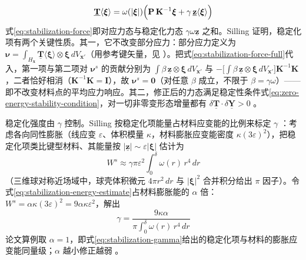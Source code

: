 \begin{equation}
  \underline{\mathbf{T}}\langle\boldsymbol{\xi}\rangle
  =\omega(|\boldsymbol{\xi}|)\Bigl(\mathbf{P}\,\mathbf{K}^{-1}\boldsymbol{\xi}
  +\gamma\,\underline{\mathbf{z}}\langle\boldsymbol{\xi}\rangle\Bigr)
  \label{eq:stabilization-force}
\end{equation}
式\eqref{eq:stabilization-force}即对应力态与稳定化力态 $\gamma\omega\underline{\mathbf{z}}$ 之和。Silling 证明，稳定化项有两个关键性质。其一，它不改变部分应力：部分应力定义为 $\boldsymbol{\nu}=\int_{H_{\mathbf{x}}}\underline{\mathbf{T}}\langle\boldsymbol{\xi}\rangle\otimes\boldsymbol{\xi}\,dV_{\mathbf{x}'}$（用参考键矢量，见 \cite{SillingLehoucq2010}）。把式\eqref{eq:stabilization-force-full}代入，第一项与第二项对 $\boldsymbol{\nu}^{s}$ 的贡献分别为 $\int\beta\,\underline{\mathbf{z}}\otimes\boldsymbol{\xi}\,dV_{\mathbf{x}'}$ 与 $-\bigl[\int\beta\,\underline{\mathbf{z}}\otimes\boldsymbol{\xi}\,dV_{\mathbf{x}'}\bigr]\mathbf{K}^{-1}\mathbf{K}$，二者恰好相消（$\mathbf{K}^{-1}\mathbf{K}=\mathbf{I}$），故 $\boldsymbol{\nu}^{s}=\mathbf{0}$（对任意 $\beta$ 成立，不限于 $\beta=\gamma\omega$）——即不改变材料点的平均应力响应。其二，修正后的力态满足稳定性条件式\eqref{eq:zero-energy-stability-condition}，对一切非零变形态增量都有 $\delta\underline{\mathbf{T}}\cdot\delta\underline{\mathbf{Y}}>0$ \cite{Silling2017}。

稳定化强度由 $\gamma$ 控制。Silling 按稳定化项能量占材料应变能的比例来标定 $\gamma$ \cite{Silling2017}：考虑各向同性膨胀（线应变 $\varepsilon$、体积模量 $\kappa$，材料膨胀应变能密度 $\kappa(3\varepsilon)^{2}$），把稳定化项类比键型材料、其能量按 $\lvert\underline{\mathbf{z}}\rvert\sim\varepsilon\lvert\boldsymbol{\xi}\rvert$ 估计为
\begin{equation}
  W^{s}\approx\gamma\pi\varepsilon^{2}\int_{0}^{\delta}\omega(r)\,r^{4}\,dr
  \label{eq:stabilization-energy-estimate}
\end{equation}
（三维球对称近场域中，球壳体积微元 $4\pi r^{2}\,dr$ 与 $\lvert\boldsymbol{\xi}\rvert^{2}$ 合并积分给出 $\pi$ 因子）。令式\eqref{eq:stabilization-energy-estimate}占材料膨胀能的 $\alpha$ 倍：$W^{s}=\alpha\kappa(3\varepsilon)^{2}=9\alpha\kappa\varepsilon^{2}$，解出
\begin{equation}
  \gamma=\frac{9\kappa\alpha}{\pi\displaystyle\int_{0}^{\delta}\omega(r)\,r^{4}\,dr}
  \label{eq:stabilization-gamma}
\end{equation}
论文算例取 $\alpha=1$，即式\eqref{eq:stabilization-gamma}给出的稳定化项与材料的膨胀应变能同量级；$\alpha$ 越小修正越弱 \cite{Silling2017}。

